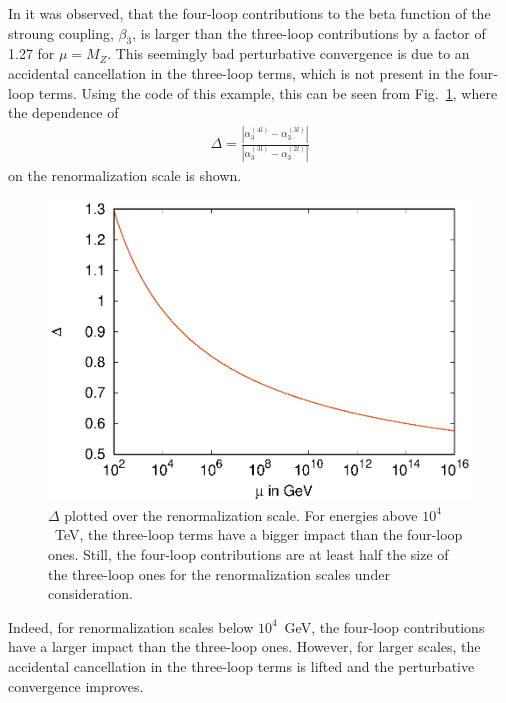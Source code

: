 \documentclass[11pt,a4paper]{article}
\begin{document}
In \cite{Davies:2019onf} it was observed, that the four-loop contributions to the
beta function of the stroung coupling, $\beta_3$, is larger than the three-loop contributions by a factor of 1.27 for $\mu = M_Z$. This seemingly bad perturbative convergence
is due to an accidental cancellation in the three-loop terms\cite{Davies:2019onf}, which is not present in the four-loop terms. Using the code of this example, this can be seen from Fig.~\ref{plt::delta}, where the dependence of
\begin{align}
\Delta = \frac{|\alpha_3^{(4l)} - \alpha_3^{(3l)}|}{|\alpha_3^{(3l)} - \alpha_3^{(2l)}|}
\end{align}
on the renormalization scale is shown.
\begin{figure}
\centering
\includegraphics{delta_running.eps}
\caption{\label{plt::delta} $\Delta$ plotted over the renormalization scale. For energies above $10^4$~TeV, the three-loop terms have a bigger impact than the four-loop ones. Still,
the four-loop contributions are at least half the size of the three-loop ones for the renormalization scales under consideration.}
\end{figure}
Indeed, for renormalization scales below $10^4$~GeV, the four-loop contributions have a larger impact than the three-loop ones. However, for larger scales,
the accidental cancellation in the three-loop terms is lifted and the perturbative convergence improves.
\end{document}
